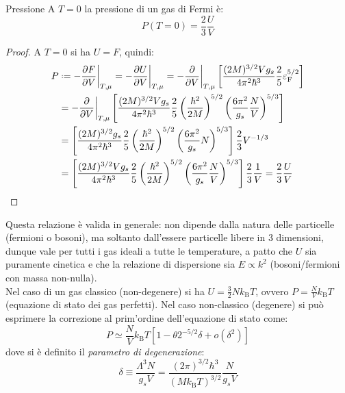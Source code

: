 \begin{proposition}{Pressione}{}
	A $ T = 0 $ la pressione di un gas di Fermi è:
	\begin{equation}
		P(T = 0) = \frac{2}{3} \frac{U}{V}
	\end{equation}

	\tcblower

	\begin{proof}
		A $ T = 0 $ si ha $ U = F $, quindi:
		\begin{equation*}
			\begin{split}
				P
				& \defeq - \frac{\pa F}{\pa V}\bigg\vert_{T,\mu} = - \frac{\pa U}{\pa V}\bigg\vert_{T,\mu} = - \frac{\pa}{\pa V}\bigg\vert_{T,\mu} \left[ \frac{(2M)^{3/2} V g_s}{4\pi^2 \hbar^3} \frac{2}{5} \varepsilon_\text{F}^{5/2} \right] \\
				& = - \frac{\pa}{\pa V}\bigg\vert_{T,\mu} \left[ \frac{(2M)^{3/2} V g_s}{4\pi^2 \hbar^3} \frac{2}{5} \left( \frac{\hbar^2}{2M} \right)^{5/2} \left( \frac{6\pi^2}{g_s} \frac{N}{V} \right)^{5/3} \right] \\
				& = \left[ \frac{(2M)^{3/2} g_s}{4\pi^2 \hbar^3} \frac{2}{5} \left( \frac{\hbar^2}{2M} \right)^{5/2} \left( \frac{6\pi^2}{g_s} N \right)^{5/3} \right] \frac{2}{3} V^{-1/3} \\
				& = \left[ \frac{(2M)^{3/2} V g_s}{4\pi^2 \hbar^3} \frac{2}{5} \left( \frac{\hbar^2}{2M} \right)^{5/2} \left( \frac{6\pi^2}{g_s} \frac{N}{V} \right)^{5/3} \right] \frac{2}{3} \frac{1}{V} = \frac{2}{3} \frac{U}{V}
			\end{split}
		\end{equation*}
	\end{proof}
\end{proposition}

Questa relazione è valida in generale: non dipende dalla natura delle particelle (fermioni o bosoni), ma soltanto dall'essere particelle libere in 3 dimensioni, dunque vale per tutti i gas ideali a tutte le temperature, a patto che $ U $ sia puramente cinetica e che la relazione di dispersione sia $ E \propto k^2 $ (bosoni/fermioni con massa non-nulla). \\
Nel caso di un gas classico (non-degenere) si ha $ U = \frac{3}{2} N k_\text{B} T $, ovvero $ P = \frac{N}{V} k_\text{B} T $ (equazione di stato dei gas perfetti). Nel caso non-classico (degenere) si può esprimere la correzione al prim'ordine dell'equazione di stato come:
\begin{equation}
	P \simeq \frac{N}{V} k_\text{B} T \left[ 1 - \theta 2^{-5/2} \delta + o(\delta^2) \right]
\end{equation}
dove si è definito il \textit{parametro di degenerazione}:
\begin{equation}
	\delta \equiv \frac{\Lambda^3 N}{g_s V} = \frac{(2\pi)^{3/2} \hbar^3}{(M k_\text{B} T)^{3/2}} \frac{N}{g_s V}
\end{equation}

